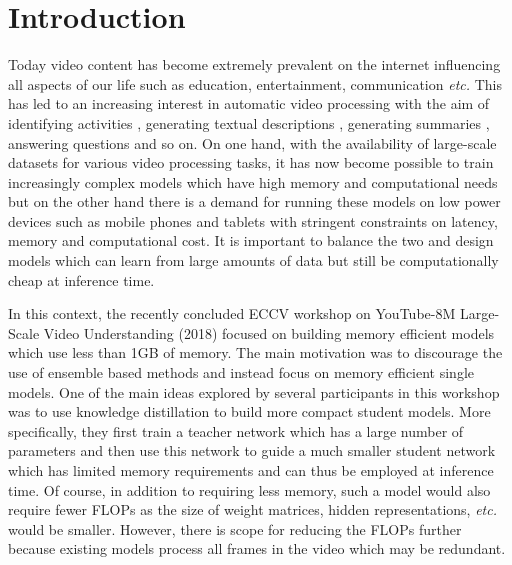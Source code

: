 \documentclass[10pt,twocolumn,letterpaper]{article}
\begin{document}
\section{Introduction}

Today video content has become extremely prevalent on the internet influencing all aspects of our life such as education, entertainment, communication \textit{etc.} This has led to an increasing interest in automatic video processing with the aim of identifying activities \cite{action-recog,video-beyond-short-snippet-classify}, generating textual descriptions \cite{lstm-description}, generating summaries \cite{videosumm,H-RNN}, answering questions \cite{tgif-qa} and so on. On one hand, with the availability of large-scale datasets \cite{UCF101,VideoSet-Dataset,HMDB-dataset,Youtube8m,sun-database} for various video processing tasks, it has now become possible to train increasingly complex models which have high memory and computational needs but on the other hand there is a demand for running these models on low power devices such as mobile phones and tablets with stringent constraints on latency, memory and computational cost. It is important to balance the two and design models which can learn from large amounts of data but still be computationally cheap at inference time.

In this context, the recently concluded ECCV workshop on YouTube-8M Large-Scale Video Understanding (2018) \cite{summary-paper} focused on building memory efficient models which use less than 1GB of memory. The main motivation was to discourage the use of ensemble based methods and instead focus on memory efficient single models. One of the main ideas explored by several participants \cite{paper1,paper2,paper3} in this workshop was to use knowledge distillation to build more compact student models. More specifically, they first train a teacher network which has a large number of parameters and then use this network to guide a much smaller student network which has limited memory requirements and can thus be employed at inference time. Of course, in addition to requiring less memory, such a model would also require fewer FLOPs as the size of weight matrices, hidden representations, \textit{etc.} would be smaller. However, there is scope for reducing the FLOPs further because existing models process all frames in the video which may be redundant.    
\end{document}
